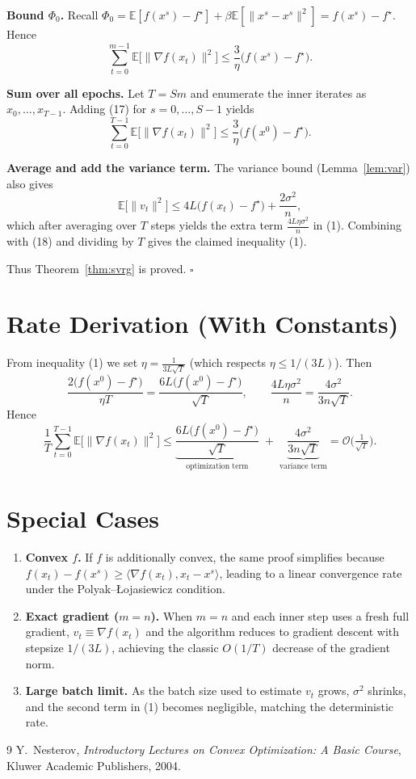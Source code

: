 \documentclass{article}
\newcommand{\E}{\mathbb{E}}
\begin{document}
\begin{enumerate}[label=\textbf{[Step \arabic*]}, leftmargin=*]
\item \textbf{Bound $\Phi_{0}$.}  
Recall $\Phi_{0}= \E[f(x^{s})-f^\star]+\beta\E[\|x^{s}-x^{s}\|^{2}]
= f(x^{s})-f^\star$.
Hence
\[
\sum_{t=0}^{m-1}\E\bigl[\|\nabla f(x_t)\|^{2}\bigr]
\le \frac{3}{\eta}\bigl(f(x^{s})-f^\star\bigr).
\tag{17}
\]

\item \textbf{Sum over all epochs.}  
Let $T=S m$ and enumerate the inner iterates as $x_0,\dots,x_{T-1}$. Adding (17) for $s=0,\dots,S-1$ yields
\[
\sum_{t=0}^{T-1}\E\bigl[\|\nabla f(x_t)\|^{2}\bigr]
\le \frac{3}{\eta}\bigl(f(x^{0})-f^\star\bigr).
\tag{18}
\]

\item \textbf{Average and add the variance term.}  
The variance bound (Lemma~\ref{lem:var}) also gives
\[
\E\bigl[\|v_t\|^{2}\bigr]\le 4L\bigl(f(x_t)-f^\star\bigr)+\frac{2\sigma^{2}}{n},
\]
which after averaging over $T$ steps yields the extra term $\frac{4L\eta\sigma^{2}}{n}$ in (1). Combining with (18) and dividing by $T$ gives the claimed inequality (1).
\end{enumerate}

Thus Theorem~\ref{thm:svrg} is proved. $\square$

\section*{Rate Derivation (With Constants)}
From inequality (1) we set $\eta=\frac{1}{3L\sqrt{T}}$ (which respects $\eta\le 1/(3L)$). Then
\[
\frac{2\bigl(f(x^{0})-f^\star\bigr)}{\eta T}
= \frac{6L\bigl(f(x^{0})-f^\star\bigr)}{\sqrt{T}},
\qquad
\frac{4L\eta\sigma^{2}}{n}
= \frac{4\sigma^{2}}{3n\sqrt{T}}.
\]
Hence
\[
\frac{1}{T}\sum_{t=0}^{T-1}\E\bigl[\|\nabla f(x_t)\|^{2}\bigr]
\le
\underbrace{\frac{6L\bigl(f(x^{0})-f^\star\bigr)}{\sqrt{T}}}_{\text{optimization term}}
\;+\;
\underbrace{\frac{4\sigma^{2}}{3n\sqrt{T}}}_{\text{variance term}}
= \mathcal{O}\!\bigl(\tfrac{1}{\sqrt{T}}\bigr).
\]

\section*{Special Cases}
\begin{enumerate}[label=\arabic*.]
\item \textbf{Convex $f$.} If $f$ is additionally convex, the same proof simplifies because $f(x_t)-f(x^{s})\ge\langle\nabla f(x_t),x_t-x^{s}\rangle$, leading to a linear convergence rate under the Polyak–Łojasiewicz condition.
\item \textbf{Exact gradient ($m=n$).} When $m=n$ and each inner step uses a fresh full gradient, $v_t\equiv\nabla f(x_t)$ and the algorithm reduces to gradient descent with stepsize $1/(3L)$, achieving the classic $O(1/T)$ decrease of the gradient norm.
\item \textbf{Large batch limit.} As the batch size used to estimate $v_t$ grows, $\sigma^{2}$ shrinks, and the second term in (1) becomes negligible, matching the deterministic rate.
\end{enumerate}

\begin{thebibliography}{9}
Y.~Nesterov, \emph{Introductory Lectures on Convex Optimization: A Basic Course}, Kluwer Academic Publishers, 2004.
\end{thebibliography}
\end{document}

